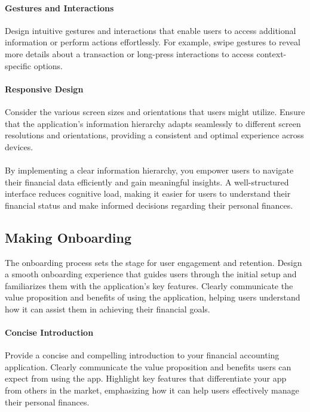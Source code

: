 \paragraph{Gestures and Interactions}
Design intuitive gestures and interactions that enable users to access additional 
information or perform actions effortlessly. For example, swipe gestures to reveal more details about a transaction 
or long-press interactions to access context-specific options.

\paragraph{Responsive Design}
Consider the various screen sizes and orientations that users might utilize. Ensure that the 
application's information hierarchy adapts seamlessly to different screen resolutions and orientations, providing a 
consistent and optimal experience across devices.\\
\\

By implementing a clear information hierarchy, you empower users to navigate their financial data efficiently and gain 
meaningful insights. A well-structured interface reduces cognitive load, making it easier for users to understand 
their financial status and make informed decisions regarding their personal finances.


\subsection{Making Onboarding}

The onboarding process sets the stage for user engagement and retention. Design a smooth onboarding experience that 
guides users through the initial setup and familiarizes them with the application's key features. Clearly communicate 
the value proposition and benefits of using the application, helping users understand how it can assist them in 
achieving their financial goals.

\paragraph{Concise Introduction}
Provide a concise and compelling introduction to your financial accounting application. Clearly 
communicate the value proposition and benefits users can expect from using the app. Highlight key features that 
differentiate your app from others in the market, emphasizing how it can help users effectively manage their personal 
finances.


